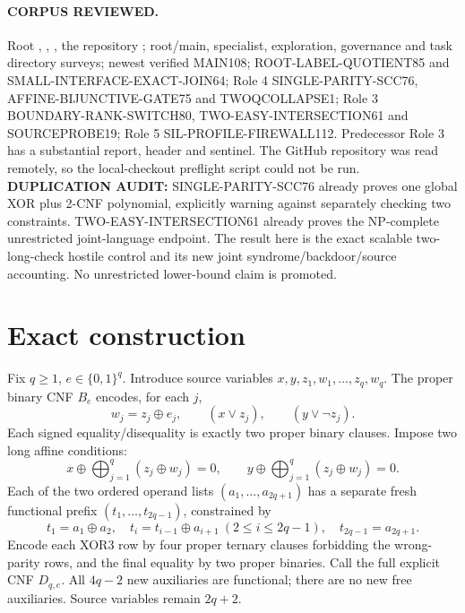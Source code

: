 \documentclass[11pt]{article}
\begin{document}
\paragraph{CORPUS REVIEWED.} Root , , , the repository ; root/main, specialist, exploration, governance and task directory surveys; newest verified MAIN108; ROOT-LABEL-QUOTIENT85 and SMALL-INTERFACE-EXACT-JOIN64; Role 4 SINGLE-PARITY-SCC76, AFFINE-BIJUNCTIVE-GATE75 and TWOQCOLLAPSE1; Role 3 BOUNDARY-RANK-SWITCH80, TWO-EASY-INTERSECTION61 and SOURCEPROBE19; Role 5 SIL-PROFILE-FIREWALL112. Predecessor Role 3 has a substantial report, header and sentinel. The GitHub repository was read remotely, so the local-checkout preflight script could not be run. \textbf{DUPLICATION AUDIT:} SINGLE-PARITY-SCC76 already proves one global XOR plus 2-CNF polynomial, explicitly warning against separately checking two constraints. TWO-EASY-INTERSECTION61 already proves the NP-complete unrestricted joint-language endpoint. The result here is the exact scalable two-long-check hostile control and its new joint syndrome/backdoor/source accounting. No unrestricted lower-bound claim is promoted.

\section{Exact construction}
Fix $q\ge1$, $e\in\{0,1\}^q$. Introduce source variables $x,y,z_1,w_1,\ldots,z_q,w_q$. The proper binary CNF $B_e$ encodes, for each $j$,
\[
w_j=z_j\oplus e_j,\qquad (x\vee z_j),\qquad(y\vee\neg z_j).
\tag{2}
\]
Each signed equality/disequality is exactly two proper binary clauses. Impose two long affine conditions:
\[
x\oplus\bigoplus_{j=1}^q(z_j\oplus w_j)=0,\qquad
y\oplus\bigoplus_{j=1}^q(z_j\oplus w_j)=0.
\tag{3}
\]
Each of the two ordered operand lists $(a_1,\ldots,a_{2q+1})$ has a separate fresh functional prefix $(t_1,\ldots,t_{2q-1})$, constrained by
\[
t_1=a_1\oplus a_2,\quad t_i=t_{i-1}\oplus a_{i+1}\ (2\le i\le2q-1),
\quad t_{2q-1}=a_{2q+1}.
\tag{4}
\]
Encode each XOR3 row by four proper ternary clauses forbidding the wrong-parity rows, and the final equality by two proper binaries. Call the full explicit CNF $D_{q,e}$. All $4q-2$ new auxiliaries are functional; there are no new free auxiliaries. Source variables remain $2q+2$.
\end{document}
